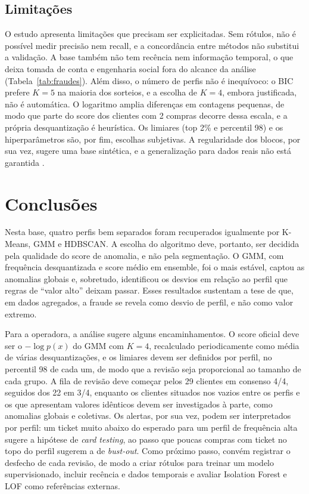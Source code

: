 \documentclass[12pt]{article}
\begin{document}
\subsection{Limitações}
O estudo apresenta limitações que precisam ser explicitadas. Sem rótulos, não é possível medir precisão nem
recall, e a concordância entre métodos não substitui a validação. A base também não tem recência nem informação
temporal, o que deixa tomada de conta e engenharia social fora do alcance da análise (Tabela~\ref{tab:fraudes}).
Além disso, o número de perfis não é inequívoco: o BIC prefere $K=5$ na maioria dos sorteios, e a escolha de
$K=4$, embora justificada, não é automática. O logaritmo amplia diferenças em contagens pequenas, de modo que
parte do score dos clientes com 2 compras decorre dessa escala, e a própria desquantização é heurística. Os
limiares (top 2\% e percentil 98) e os hiperparâmetros são, por fim, escolhas subjetivas. A regularidade dos
blocos, por sua vez, sugere uma base sintética, e a generalização para dados reais não está garantida
\cite{santos2024sintetico}.

\section{Conclusões}
Nesta base, quatro perfis bem separados foram recuperados igualmente por K-Means, GMM e HDBSCAN. A escolha do
algoritmo deve, portanto, ser decidida pela qualidade do score de anomalia, e não pela segmentação. O GMM, com
frequência desquantizada e score médio em ensemble, foi o mais estável, captou as anomalias globais e, sobretudo,
identificou os desvios em relação ao perfil que regras de ``valor alto'' deixam passar. Esses resultados sustentam
a tese de que, em dados agregados, a fraude se revela como desvio de perfil, e não como valor extremo.

Para a operadora, a análise sugere alguns encaminhamentos. O score oficial deve ser o $-\log p(x)$ do GMM com
$K=4$, recalculado periodicamente como média de várias desquantizações, e os limiares devem ser definidos por
perfil, no percentil 98 de cada um, de modo que a revisão seja proporcional ao tamanho de cada grupo. A fila de
revisão deve começar pelos 29 clientes em consenso 4/4, seguidos dos 22 em 3/4, enquanto os clientes situados nos
vazios entre os perfis e os que apresentam valores idênticos devem ser investigados à parte, como anomalias
globais e coletivas. Os alertas, por sua vez, podem ser interpretados por perfil: um ticket muito abaixo do
esperado para um perfil de frequência alta sugere a hipótese de \emph{card testing}, ao passo que poucas compras
com ticket no topo do perfil sugerem a de \emph{bust-out}. Como próximo passo, convém registrar o desfecho de cada
revisão, de modo a criar rótulos para treinar um modelo supervisionado, incluir recência e dados temporais e
avaliar Isolation Forest e LOF como referências externas.
\end{document}
